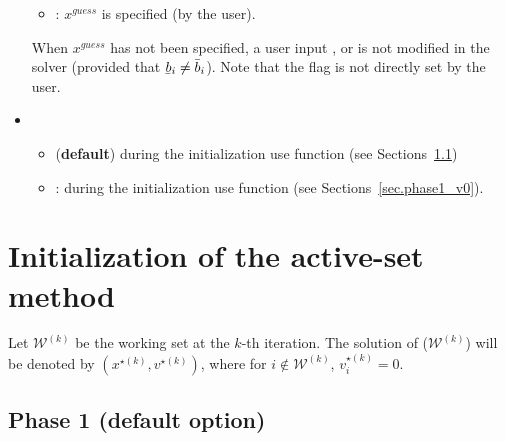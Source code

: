 \documentclass[12pt,a4paper]{article}
\newcommand{\ubar}[1]{\underaccent{\bar}{#1}}
\begin{document}
\begin{itemize}
\begin{itemize}
  \item[\ding{237}] : $x^{\mathit{guess}}$ is specified (by the user).

  \end{itemize} 

  \noindent When $x^{\mathit{guess}}$ has not been specified, a user input ,
   or  is not modified in the solver (provided that
  $\ubar{b}_i \neq \bar{b}_i$). Note that the flag  is not directly set
  by the user.

\item {}

  \begin{itemize}
  \item[\ding{237}]  ({\bf default}) during the initialization use function  (see Sections~\ref{sec.phase1})

  \item[\ding{237}] : during the initialization use function  (see Sections~\ref{sec.phase1_v0}).
  \end{itemize} 

  
\end{itemize}

\clearpage

\section{Initialization of the active-set method}

Let $\mathcal{W}^{(k)}$ be the working set at the $k$-th iteration. The solution of
($\mathcal{W}^{(k)}$) will be denoted by $(x^{\star(k)},v^{\star(k)})$, where for
$i\not\in \mathcal{W}^{(k)}$, $v_i^{\star(k)} = 0$.

\subsection{Phase 1 (default option)} \label{sec.phase1}
\end{document}
